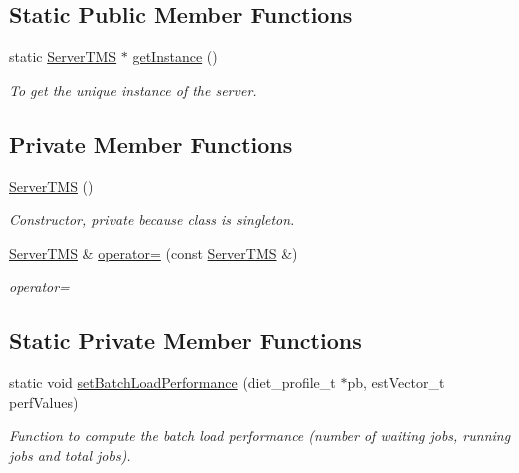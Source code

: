 \subsection*{Static Public Member Functions}
\begin{DoxyCompactItemize}
\item 
\hypertarget{classServerTMS_a8880ada96e5fa2e57b5ffdbe82cc3c56}{
static \hyperlink{classServerTMS}{ServerTMS} $\ast$ \hyperlink{classServerTMS_a8880ada96e5fa2e57b5ffdbe82cc3c56}{getInstance} ()}
\label{classServerTMS_a8880ada96e5fa2e57b5ffdbe82cc3c56}

\begin{DoxyCompactList}\small\item\em To get the unique instance of the server. \item\end{DoxyCompactList}\end{DoxyCompactItemize}
\subsection*{Private Member Functions}
\begin{DoxyCompactItemize}
\item 
\hypertarget{classServerTMS_ab53abf4787d825412407c130155dd28b}{
\hyperlink{classServerTMS_ab53abf4787d825412407c130155dd28b}{ServerTMS} ()}
\label{classServerTMS_ab53abf4787d825412407c130155dd28b}

\begin{DoxyCompactList}\small\item\em Constructor, private because class is singleton. \item\end{DoxyCompactList}\item 
\hypertarget{classServerTMS_aa966756d974810cbb474aa0f620dc6fc}{
\hyperlink{classServerTMS}{ServerTMS} \& \hyperlink{classServerTMS_aa966756d974810cbb474aa0f620dc6fc}{operator=} (const \hyperlink{classServerTMS}{ServerTMS} \&)}
\label{classServerTMS_aa966756d974810cbb474aa0f620dc6fc}

\begin{DoxyCompactList}\small\item\em operator= \item\end{DoxyCompactList}\end{DoxyCompactItemize}
\subsection*{Static Private Member Functions}
\begin{DoxyCompactItemize}
\item 
static void \hyperlink{classServerTMS_a277dcd0ef987c37c18c5d8d56ed9a27d}{setBatchLoadPerformance} (diet\_\-profile\_\-t $\ast$pb, estVector\_\-t perfValues)
\begin{DoxyCompactList}\small\item\em Function to compute the batch load performance (number of waiting jobs, running jobs and total jobs). \item\end{DoxyCompactList}\end{DoxyCompactItemize}
